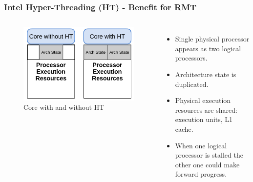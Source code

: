 \documentclass[xcolor=pdftex,dvipsnames,table]{beamer}
\begin{document}
\begin{frame}
	\frametitle{Intel Hyper-Threading (HT) - Benefit for RMT}
    \begin{columns}[c]
		\column{2in}
           \begin{figure}[H]
    			\begin{center}
                	\captionsetup{labelformat=empty,labelsep=none}
	    			\includegraphics[scale=0.22]{HyperThreading.png}
            		\caption{Core with and without HT}
    			\end{center}
    	   \end{figure}
        \column{2.5in}
          \begin{itemize}
              \item Single physical processor appears as two logical processors. \pause
              \item Architecture state is duplicated. \pause
              \item Physical execution resources are shared: execution units, L1 cache. \pause  
              \item When one logical processor is stalled the other one could make forward progress.
          \end{itemize}
   	\end{columns}
\end{frame}
\end{document}
